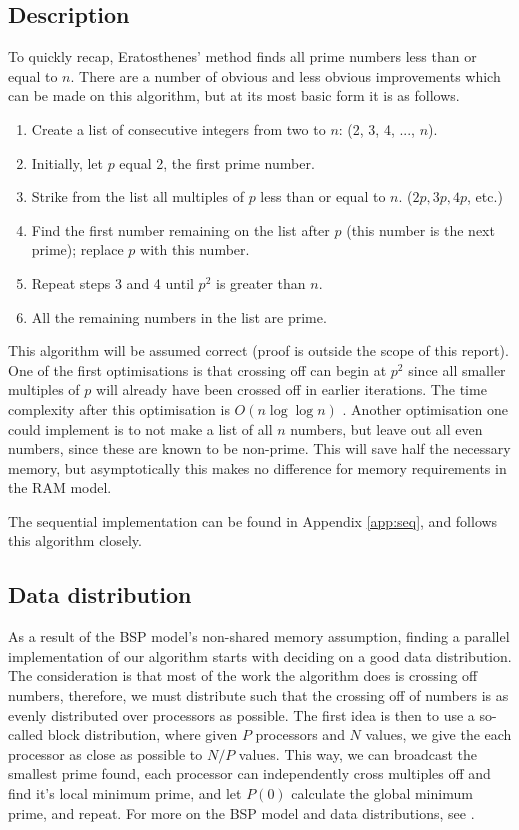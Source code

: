 \documentclass[a4paper]{article}
\begin{document}
\subsection{Description}

To quickly recap, Eratosthenes' method finds all prime numbers less than or
equal to $n$. There are a number of obvious and less
obvious improvements which can be made on this algorithm, but at its most basic
form it is as follows. 

\begin{enumerate}
    \item Create a list of consecutive integers from two to $n$: (2, 3, 4, ...,
        $n$).
    \item Initially, let $p$ equal 2, the first prime number.
    \item Strike from the list all multiples of $p$ less than or equal to $n$.
        ($2p, 3p, 4p$, etc.)
    \item Find the first number remaining on the list after $p$ (this number is
        the next prime); replace $p$ with this number.
    \item Repeat steps 3 and 4 until $p^2$ is greater than $n$.
    \item All the remaining numbers in the list are prime.
\end{enumerate}

This algorithm will be assumed correct (proof is outside the scope of this
report). One of the
first optimisations is that crossing off can begin at $p^2$ since all smaller
multiples of $p$ will already have been crossed off in earlier iterations. The
time complexity after this optimisation is $O(n \log \log n)$ \cite{pp}. Another
optimisation one could implement is to not make a list of all $n$ numbers, but
leave out all even numbers, since these are known to be non-prime. This will
save half the necessary memory, but asymptotically this makes no difference for
memory requirements in the RAM model. 

The sequential implementation can be found in Appendix \ref{app:seq}, and
follows this algorithm closely. 

\subsection{Data distribution}

As a result of the BSP model's non-shared memory assumption,  finding a parallel
implementation of our algorithm starts with deciding on a good data
distribution. The consideration is that most of the work the algorithm does is
crossing off numbers, therefore, we must distribute such that the crossing off
of numbers is as evenly distributed over processors as possible. The first idea
is then to use a so-called block distribution, where given $P$ processors and
$N$ values, we give the each processor as close as possible to $N/P$ values. This way, we can
broadcast the smallest prime found, each processor can independently cross
multiples off and find it's local minimum prime, and let $P(0)$ calculate the
global minimum prime, and repeat. For more on the BSP model and data
distributions, see \cite{biss}.
\end{document}
